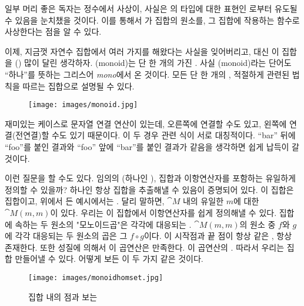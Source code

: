 일부 머리 좋은 독자는 정수에서 \trAdder{} 사상이, 사실은 의 타입에 대한 표현인 로부터 유도될 수 있음을 눈치챘을 것이다.
이를 통해서 가 \trMonoid 집합의 원소를, 그 집합에 작용하는 함수로 사상한다는 점을 알 수 있다.

이제, 지금껏 자연수 집합에서 여러 가지를 해왔다는 사실을 잊어버리고, 대신 이 집합을 \trMorphism\이(\trAdder\가) 많이 달린 \trObject{} 생각하자.
\trMonoid(monoid)는 단 한 개의 \trObject\를 가진 . 사실 \trMonoid(monoid)라는 단어도 ``하나''를 뜻하는 그리스어 \emph{mono}에서 온 것이다.
모든 \trMonoid\는 단 한 개의 \trObject\와, 적절하게  관련된 법칙을 따르는  집합으로 설명될 수 있다.

\begin{figure}[H]
\centering
\texttt{[image: images/monoid.jpg]}
\end{figure}

\noindent
재미있는 케이스로 문자열 연결 연산이 있는데, 오른쪽에 연결할 수도 있고, 왼쪽에 연결(전연결)할 수도 있기 때문이다.
이 두 경우 \trComposition 관련 식이 서로 대칭적이다.
``bar'' 뒤에 ``foo''를 붙인 결과와 ``foo'' 앞에 ``bar''를 붙인 결과가 같음을 생각하면 쉽게 납득이 갈 것이다.

이런 질문을 할 수도 있다. 임의의  \trMonoid(\trObject\가 하나인 \trCategory), 집합과 이항연산자를 포함하는 \trMonoid\를 유일하게 정의할 수 있을까?
\trObject\가 하나인  항상 집합을 추출해낼 수 있음이 증명되어 있다. 이 집합은  집합이고, 위에서 든 예시에서는 .
달리 말하면, \trCategory $\cat{M}$ 내의 유일한 \trObject $m$에 대한 \trHomSet $\cat{M}(m, m)$이 있다. 
우리는 이 집합에서 이항연산자를 쉽게 정의해낼 수 있다. 집합에 속하는 두 원소의 "모노이드곱"은 각각에 대응되는  \trComposition{}.
$\cat{M}(m, m)$의 원소 중 $f$와 $g$에 각각 대응되는 두 원소의 곱은 그  $f \circ g$이다.
이  시작점과 끝 점이 항상 같은 , \trComposition\은 항상 존재한다. %
또한  성질에 의해서 이 곱연산은 \trAssociativity\를 만족한다. \trIdentityMorphism\이 이 곱연산의 . 
따라서 우리는 \trCategory\trMonoid{} 집합 \trMonoid\를 만들어낼 수 있다. 어떻게 보든 이 두 가지 \trMonoid\는 같은 것이다.

\begin{figure}[H]
\centering
\texttt{[image: images/monoidhomset.jpg]}
\caption{집합 내의 점과 \trMorphism\로 보는 \trMonoid\trHomSet}
\end{figure}

